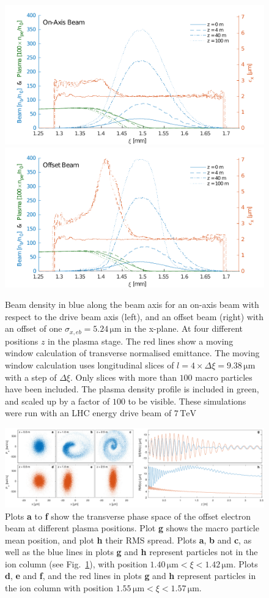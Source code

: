 \documentclass[aps,prstab,reprint,amsmath,amssymb,groupedaddress]{revtex4-1}
\newcommand{\unit}[1]{\,\mathrm{#1}}
\begin{document}
\begin{figure}[hbt]
    \includegraphics[width=0.495\linewidth,trim={2mm 0mm 2mm 0mm},clip]{figures/beamEmittance}
    \includegraphics[width=0.495\linewidth,trim={2mm 0mm 2mm 0mm},clip]{figures/beamEmittanceOffset}
    \caption{\label{Fig:BeamEmitt} Beam density in blue along the beam axis for an on-axis beam with respect to the
        drive beam axis (left), and an offset beam (right) with an offset of one $\sigma_{x,eb} = 5.24\unit{\mu m}$ in
        the x-plane. At four different positions $z$ in the plasma stage. The red lines show a moving window calculation
        of transverse normalised emittance. The moving window calculation uses longitudinal slices of
        $l = 4\times\Delta\xi = 9.38\unit{\mu m}$ with a step of $\Delta\xi$. Only slices with more than $100$ macro
        particles have been included. The plasma density profile is included in green, and scaled up by a factor of
        $100$ to be visible. These simulations were run with an LHC energy drive beam of $7\unit{TeV}$}
\end{figure}

\begin{figure}[hbt]
    \includegraphics[width=\linewidth,trim={0mm 0mm 0mm 0mm},clip]{figures/beamFilamentationAll}
    \caption{\label{Fig:BeamFilament} Plots \textbf{a} to \textbf{f} show the transverse phase space of the offset
        electron beam at different plasma positions. Plot \textbf{g} shows the macro particle mean position, and plot
        \textbf{h} their RMS spread. Plots \textbf{a}, \textbf{b} and \textbf{c}, as well as the blue lines in plots
        \textbf{g} and \textbf{h} represent particles %
        not in the ion column (see Fig.~\ref{Fig:BeamEmitt}), with position $1.40\unit{\mu m} < \xi < 1.42\unit{\mu m}$.
        Plots \textbf{d}, \textbf{e} and \textbf{f}, and the red lines in plots \textbf{g} and \textbf{h} represent
        particles in the ion column with position $1.55\unit{\mu m} < \xi < 1.57\unit{\mu m}$.}
\end{figure}
\end{document}
